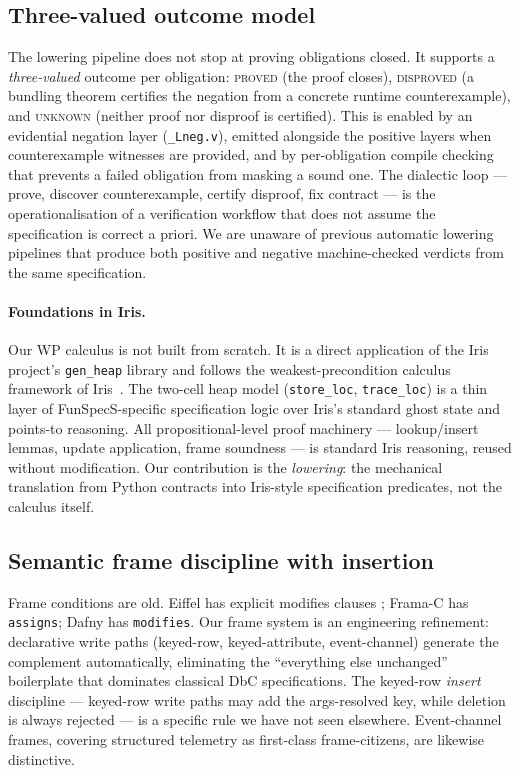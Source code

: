 \documentclass[11pt,a4paper]{article}
\begin{document}
\subsection{Three-valued outcome model}
\label{sec:contrib-three-valued}

The lowering pipeline does not stop at proving obligations closed.  It
supports a \emph{three-valued} outcome per obligation: \textsc{proved}
(the proof closes), \textsc{disproved} (a bundling theorem certifies
the negation from a concrete runtime counterexample), and
\textsc{unknown} (neither proof nor disproof is certified).  This is
enabled by an evidential negation layer (\texttt{\_Lneg.v}), emitted
alongside the positive layers when counterexample witnesses are
provided, and by per-obligation compile checking that prevents a
failed obligation from masking a sound one.  The dialectic loop ---
prove, discover counterexample, certify disproof, fix contract --- is
the operationalisation of a verification workflow that does not assume
the specification is correct a priori.  We are unaware of previous
automatic lowering pipelines that produce both positive and negative
machine-checked verdicts from the same specification.

\paragraph{Foundations in Iris.}
Our WP calculus is not built from scratch.  It is a direct
application of the Iris project's \texttt{gen\_heap} library
\cite{Jung18} and follows the weakest-precondition calculus
framework of Iris~\cite{Iris}.  The two-cell heap model
(\texttt{store\_loc}, \texttt{trace\_loc}) is a thin layer of
FunSpecS-specific specification logic over Iris's standard ghost
state and points-to reasoning.  All propositional-level proof
machinery --- lookup/insert lemmas, update application, frame
soundness --- is standard Iris reasoning, reused without
modification.  Our contribution is the \emph{lowering}: the
mechanical translation from Python contracts into Iris-style
specification predicates, not the calculus itself.

\subsection{Semantic frame discipline with insertion}
\label{sec:contrib-frames}

Frame conditions are old.  Eiffel has explicit modifies clauses
\cite{Meyer92}; Frama-C has \texttt{assigns}; Dafny has
\texttt{modifies}.  Our frame system is an engineering refinement:
declarative write paths (keyed-row, keyed-attribute, event-channel)
generate the complement automatically, eliminating the
``everything else unchanged'' boilerplate that dominates classical
DbC specifications.  The keyed-row \emph{insert} discipline ---
keyed-row write paths may add the args-resolved key, while deletion
is always rejected --- is a specific rule we have not seen elsewhere.
Event-channel frames, covering structured telemetry as first-class
frame-citizens, are likewise distinctive.
\end{document}
